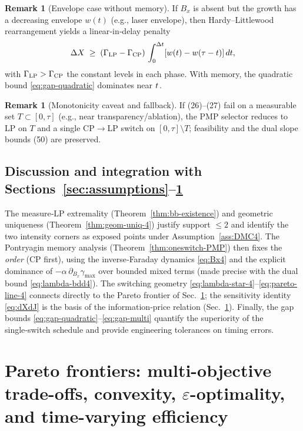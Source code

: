\documentclass[aps,pre,twocolumn,showpacs,superscriptaddress]{revtex4-2}
\theoremstyle{definition}
\newtheorem{remark}[theorem]{Remark}
\begin{document}
\begin{remark}[Envelope case without memory]
If $B_x$ is absent but the growth has a decreasing envelope $w(t)$ (e.g., laser envelope), then Hardy–Littlewood rearrangement yields a linear‑in‑delay penalty
\[
\Delta X \;\ge\; (\Gamma_{\rm LP}-\Gamma_{\rm CP})\,\int_0^{\Delta t}[w(t)-w(\tau-t)]\,dt,
\]
with $\Gamma_{\rm LP}>\Gamma_{\rm CP}$ the constant levels in each phase. With memory, the quadratic bound \eqref{eq:gap-quadratic} dominates near $t^{\*}$.
\end{remark}

\begin{remark}[Monotonicity caveat and fallback]
If (26)–(27) fail on a measurable set $T\subset[0,\tau]$ (e.g., near transparency/ablation), the PMP selector reduces to LP on $T$ and a single CP$\to$LP switch on $[0,\tau]\setminus T$; feasibility and the dual slope bounds (50) are preserved.
\end{remark}

\subsection{Discussion and integration with Sections~\ref{sec:assumptions}--\ref{sec:Pareto}}\label{subsec:integration4}

The measure‑LP extremality (Theorem~\ref{thm:bb-existence}) and geometric uniqueness (Theorem~\ref{thm:geom-uniq-4}) justify support $\le 2$ and identify the two intensity corners as exposed points under Assumption~\ref{ass:DMC4}. The Pontryagin memory analysis (Theorem~\ref{thm:oneswitch-PMP}) then fixes the \emph{order} (CP first), using the inverse‑Faraday dynamics \eqref{eq:Bx4} and the explicit dominance of $-\alpha\,\partial_{B_x}\gamma_{\max}$ over bounded mixed terms (made precise with the dual bound \eqref{eq:lambda-bdd4}). The switching geometry \eqref{eq:lambda-star-4}–\eqref{eq:pareto-line-4} connects directly to the Pareto frontier of Sec.~\ref{sec:Pareto}; the sensitivity identity \eqref{eq:dXdJ} is the basis of the information‑price relation (Sec.~\ref{sec:Pareto}). Finally, the gap bounds \eqref{eq:gap-quadratic}–\eqref{eq:gap-multi} quantify the superiority of the single‑switch schedule and provide engineering tolerances on timing errors.

\section{Pareto frontiers: multi-objective trade-offs, convexity, $\varepsilon$-optimality, and time-varying efficiency}\label{sec:Pareto}
\end{document}
